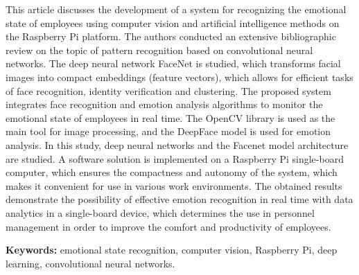 This article discusses the development of a system for recognizing the
emotional state of employees using computer vision and artificial
intelligence methods on the Raspberry Pi platform. The authors conducted
an extensive bibliographic review on the topic of pattern recognition
based on convolutional neural networks. The deep neural network FaceNet
is studied, which transforms facial images into compact embeddings
(feature vectors), which allows for efficient tasks of face recognition,
identity verification and clustering. The proposed system integrates
face recognition and emotion analysis algorithms to monitor the
emotional state of employees in real time. The OpenCV library is used as
the main tool for image processing, and the DeepFace model is used for
emotion analysis. In this study, deep neural networks and the Facenet
model architecture are studied. A software solution is implemented on a
Raspberry Pi single-board computer, which ensures the compactness and
autonomy of the system, which makes it convenient for use in various
work environments. The obtained results demonstrate the possibility of
effective emotion recognition in real time with data analytics in a
single-board device, which determines the use in personnel management in
order to improve the comfort and productivity of employees.

{\bfseries Keywords:} emotional state recognition, computer vision,
Raspberry Pi, deep learning, convolutional neural networks.

